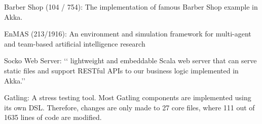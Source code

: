 Barber Shop (104 / 754): The implementation of famous Barber Shop example in Akka.

EnMAS (213/1916): An environment and simulation framework for multi-agent and team-based artificial intelligence research

Socko Web Server: \lq\lq{} lightweight and embeddable Scala web server that can serve static files and support RESTful APIs to our business logic implemented in Akka.\rq\rq{}

Gatling: A stress testing tool.  Most Gatling components are implemented using its own DSL.  Therefore, changes are only made to 27 core files, where 111 out of 1635 lines of code are modified.



